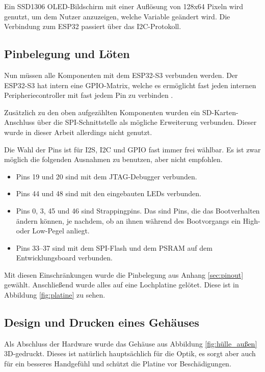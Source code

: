 Ein SSD1306 OLED-Bildschirm mit einer Auflösung von 128x64 Pixeln wird genutzt, 
um dem Nutzer anzuzeigen, welche
Variable geändert wird. Die Verbindung zum ESP32 passiert über das
I2C-Protokoll.

\subsection{Pinbelegung und Löten}

Nun müssen alle Komponenten mit dem ESP32-S3 verbunden werden.
Der ESP32-S3 hat intern eine GPIO-Matrix, welche es ermöglicht fast
jeden internen Peripheriecontroller mit fast jedem Pin zu verbinden 
\cite{esp32S3gpio}.

Zusätzlich zu den oben aufgezählten Komponenten wurden ein SD-Karten-Anschluss
über die SPI-Schnittstelle als mögliche Erweiterung verbunden. 
Dieser wurde in dieser Arbeit allerdings nicht genutzt.

Die Wahl der Pins ist für I2S, I2C und GPIO fast immer frei wählbar.
Es ist zwar möglich die folgenden Ausnahmen zu benutzen, aber nicht empfohlen.
\begin{itemize}
    \item Pins 19 und 20 sind mit dem JTAG-Debugger verbunden.
    \item Pins 44 und 48 sind mit den eingebauten LEDs verbunden.
    \item Pins 0, 3, 45 und 46 sind Strappingpins. Das sind Pins, die das Bootverhalten
            ändern können, je nachdem, ob an ihnen während des Bootvorgangs ein
            High- oder Low-Pegel anliegt.
    \item Pins 33--37 sind mit dem SPI-Flash und dem PSRAM auf dem
    Entwicklungsboard verbunden.
\end{itemize}

Mit diesen Einschränkungen wurde die Pinbelegung aus Anhang \ref{sec:pinout} 
gewählt.
Anschließend wurde alles auf eine Lochplatine gelötet. 
Diese ist in Abbildung \ref{fig:platine} zu sehen.


\subsection{Design und Drucken eines Gehäuses}

Als Abschluss der Hardware wurde das Gehäuse aus Abbildung \ref{fig:hülle_außen} 
3D-gedruckt. Dieses
ist natürlich hauptsächlich für die Optik, es sorgt aber auch für ein 
besseres Handgefühl und schützt die Platine vor Beschädigungen.

